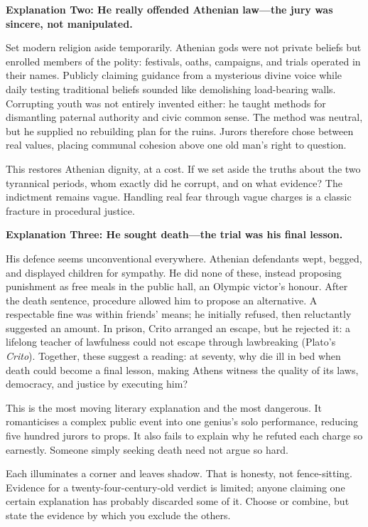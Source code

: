 \textbf{Explanation Two: He really offended Athenian law---the jury was sincere, not manipulated.}

Set modern religion aside temporarily. Athenian gods were not private beliefs but enrolled members of the polity: festivals, oaths, campaigns, and trials operated in their names. Publicly claiming guidance from a mysterious divine voice while daily testing traditional beliefs sounded like demolishing load-bearing walls. Corrupting youth was not entirely invented either: he taught methods for dismantling paternal authority and civic common sense. The method was neutral, but he supplied no rebuilding plan for the ruins. Jurors therefore chose between real values, placing communal cohesion above one old man's right to question.

This restores Athenian dignity, at a cost. If we set aside the truths about the two tyrannical periods, whom exactly did he corrupt, and on what evidence? The indictment remains vague. Handling real fear through vague charges is a classic fracture in procedural justice.

\textbf{Explanation Three: He sought death---the trial was his final lesson.}

His defence seems unconventional everywhere. Athenian defendants wept, begged, and displayed children for sympathy. He did none of these, instead proposing punishment as free meals in the public hall, an Olympic victor's honour. After the death sentence, procedure allowed him to propose an alternative. A respectable fine was within friends' means; he initially refused, then reluctantly suggested an amount. In prison, Crito arranged an escape, but he rejected it: a lifelong teacher of lawfulness could not escape through lawbreaking (Plato's \textit{Crito}). Together, these suggest a reading: at seventy, why die ill in bed when death could become a final lesson, making Athens witness the quality of its laws, democracy, and justice by executing him?

This is the most moving literary explanation and the most dangerous. It romanticises a complex public event into one genius's solo performance, reducing five hundred jurors to props. It also fails to explain why he refuted each charge so earnestly. Someone simply seeking death need not argue so hard.

Each illuminates a corner and leaves shadow. That is honesty, not fence-sitting. Evidence for a twenty-four-century-old verdict is limited; anyone claiming one certain explanation has probably discarded some of it. Choose or combine, but state the evidence by which you exclude the others.

